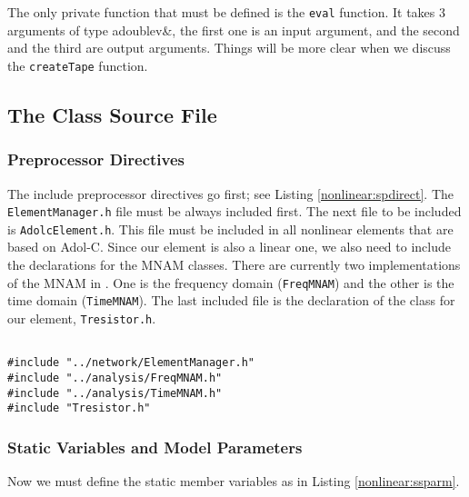 The only private function that must be defined is the \texttt{eval}
function.
It takes 3 arguments of type adoublev\&, the first one is an input argument,
and the second and the third are output arguments. Things will be more clear
when we discuss the \texttt{createTape} function.

\subsection{The Class Source File}

\subsubsection{Preprocessor Directives}

The include preprocessor directives go first; see Listing
\ref{nonlinear:spdirect}. The \texttt{ElementManager.h} file
must be always included first. The next file to be included is
\texttt{AdolcElement.h}. This file must be included in all nonlinear
elements that are based on Adol-C.  Since our element is also a linear
one, we also need to include the declarations for the MNAM classes.
There are currently two implementations of the MNAM in \FDA.  One is
the frequency domain (\texttt{FreqMNAM}) and the other is the
time domain (\texttt{TimeMNAM}). The last included file is the
declaration of the class for our element, \texttt{Tresistor.h}.

\begin{lstlisting}[firstnumber=1, label={nonlinear:spdirect},
    caption={Preprocessor directives of Tresistor.cc}]

#include "../network/ElementManager.h"
#include "../analysis/FreqMNAM.h"
#include "../analysis/TimeMNAM.h"
#include "Tresistor.h"
\end{lstlisting}

\subsubsection{Static Variables and Model Parameters}
Now we must define the static member variables as in Listing
\ref{nonlinear:ssparm}.

